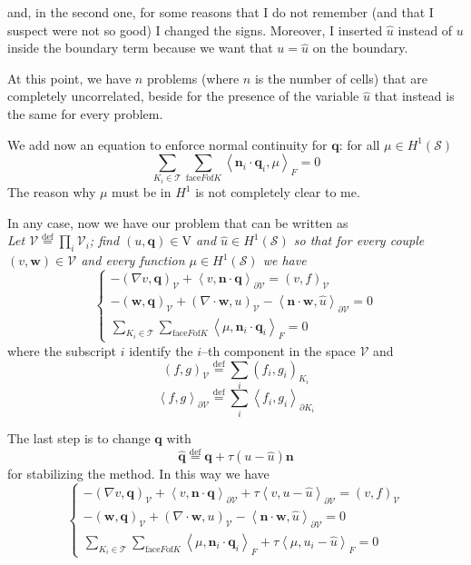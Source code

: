 \documentclass[a4paper,12pt]{article}
\newcommand{\Def}{\stackrel{\mathrm{def}}{=}}
\newcommand{\diver}[1]{\ensuremath{\nabla \cdot #1}}
\newcommand{\uu}{u}
\newcommand{\q}{\mathbf{q}}
\newcommand{\skeleton}{\mathcal{S}}
\newcommand{\triangulation}{\mathcal{T}}
\begin{document}
and, in the second one, for some reasons that I do not remember (and that I suspect were not so 
good) I changed the signs. Moreover, I inserted $\hat{\uu}$ instead of $\uu$ inside the boundary 
term because we want that $\uu = \hat{\uu}$ on the boundary.

At this point, we have $n$ problems (where $n$ is the number of cells) that are completely 
uncorrelated, beside for the presence of the variable $\hat{\uu}$ that instead is the same for every
problem.

We add now an equation to enforce normal continuity for $\q$: for all $\mu \in H^1(\skeleton)$
\[  \sum_{K_i \in \triangulation} \sum_{\mathrm{face } F \mathrm{ of } K} \left<
\mathbf{n}_i \cdot \q_i, \mu\right>_{F} = 0 \]
The reason why $\mu$ must be in $H^1$ is not completely clear to me.

In any case, now we have our problem that can be written as \\
{\it Let $\mathcal{V} \Def \prod_{i} \mathcal{V}_i$; find $(\uu, \q) \in \mathrm{V}$ and 
$\hat{\uu} \in H^1(\skeleton)$ so that for every couple $(v, \mathbf{w}) \in \mathcal{V}$ and
every function $\mu \in H^1(\skeleton)$ we have}
\[
    \begin{cases}
      -\left(\nabla v, \q\right)_{\mathcal{V}} + \left<v, \mathbf{n} \cdot 
          \q\right>_{\partial \mathcal{V}} = \left(v, f\right)_{\mathcal{V}} \\
      -\left(\mathbf{w}, \q\right)_{\mathcal{V}} \! + \left(\diver{\mathbf{w}},\uu 
          \right)_{\mathcal{V}} \! -  \left<\mathbf{n} \cdot \mathbf{w}, \hat{\uu}
          \right>_{\partial \mathcal{V}} = 0 \\
     \displaystyle \sum_{K_i \in \triangulation} \sum_{\mathrm{face } F \mathrm{ of } K} \left< \mu,
          \mathbf{n}_i \cdot \q_i\right>_{F} = 0 
    \end{cases}
\]
where the subscript $i$ identify the $i$--th component in the space $\mathcal{V}$ and 
\[ \left( f, g \right)_{\mathcal{V}} \Def \sum_{i} \left(f_{i}, g_{i}\right)_{K_i}\]
\[ \left< f, g \right>_{\partial\mathcal{V}} \Def \sum_{i} \left<f_i, g_i \right>_{\partial K_i} \]

The last step is to change $\q$ with 
\[\hat{\q} \Def \q + \tau \left(\uu - \hat{\uu} \right)\mathbf{n} \]
for stabilizing the method. In this way we have
\[
     \begin{cases}
      -\left(\nabla v, \q\right)_{\mathcal{V}} + \left<v, \mathbf{n} \cdot 
          \q\right>_{\partial \mathcal{V}} +\tau \left<v, \uu - \hat{\uu} \right>_{\partial 
\mathcal{V}}  = \left(v, f\right)_{\mathcal{V}} \\
      -\left(\mathbf{w}, \q\right)_{\mathcal{V}} \! + \left(\diver{\mathbf{w}},\uu 
          \right)_{\mathcal{V}} \! -  \left<\mathbf{n} \cdot \mathbf{w}, \hat{\uu}
          \right>_{\partial \mathcal{V}} = 0 \\
     \displaystyle \sum_{K_i \in \triangulation} \sum_{\mathrm{face } F \mathrm{ of } K} \left< 
          \mu, \mathbf{n}_i \cdot \q_i\right>_{F} +\tau \left<\mu, \uu_i - \hat{\uu} \right>_{F} 
= 0 
    \end{cases}
\]
\end{document}

